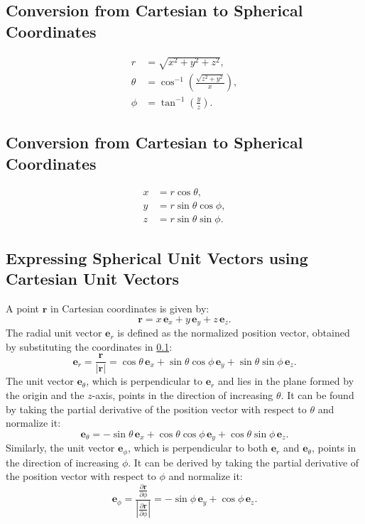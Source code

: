 \subsection{Conversion from Cartesian to Spherical Coordinates} 
\label{Conversion from Cartesian to Spherical Coordinates}
\begin{align}
    r &= \sqrt{x^2 + y^2 + z^2}, \\
    \theta &= \cos^{-1} \left(\frac{\sqrt{z^2 + y^2}}{x}\right), \\
    \phi &= \tan^{-1} \left(\frac{y}{z}\right).
\end{align}

\subsection{Conversion from Cartesian to Spherical Coordinates} 
\label{Conversion from Spherical to Cartesian Coordinates}
\begin{align}
    x &= r \cos \theta, \\
    y &= r \sin \theta \cos \phi, \\
    z &= r \sin \theta \sin \phi.   
\end{align}

\subsection{Expressing Spherical Unit Vectors using Cartesian Unit Vectors}
A point $\mathbf{r}$ in Cartesian coordinates is given by:
\[
\mathbf{r} = x \, \mathbf{e}_x + y \, \mathbf{e}_y + z \, \mathbf{e}_z.
\]
The radial unit vector \( \mathbf{e}_r \) is defined as the normalized position 
vector, obtained by substituting the coordinates in 
\ref{Conversion from Cartesian to Spherical Coordinates}:
\begin{equation}
\mathbf{e}_r = \frac{\mathbf{r}}{|\mathbf{r}|} = \cos\theta \, \mathbf{e}_x + 
\sin\theta \cos\phi \, \mathbf{e}_y + \sin\theta \sin\phi  \, \mathbf{e}_z.
\label{e_r}
\end{equation}
The unit vector \( \mathbf{e}_\theta \), which is perpendicular to \( 
\mathbf{e}_r \) and lies in the plane formed by the origin and the \( z \)-axis, 
points in the direction of increasing \( \theta \). It can be found by taking the 
partial derivative of the position vector with respect to \( \theta \) and 
normalize it:
\begin{equation}
\mathbf{e}_\theta = -\sin\theta \, \mathbf{e}_x + \cos\theta \cos\phi \, 
\mathbf{e}_y + \cos\theta \sin\phi \, \mathbf{e}_z.
\label{e_theta}
\end{equation}
Similarly, the unit vector \( \mathbf{e}_\phi \), which is perpendicular to both 
\( \mathbf{e}_r \) and \( \mathbf{e}_\theta \), points in the direction of 
increasing \( \phi \). It can be derived by taking the partial derivative of the 
position vector with respect to \( \phi \) and normalize it:
\[
\mathbf{e}_\phi = \frac{\frac{\partial \mathbf{r}}{\partial 
\phi}}{|\frac{\partial \mathbf{r}}{\partial \phi}|} = - \sin\phi  \, \mathbf{e}_y 
+ \cos\phi \, \mathbf{e}_z.
\]

